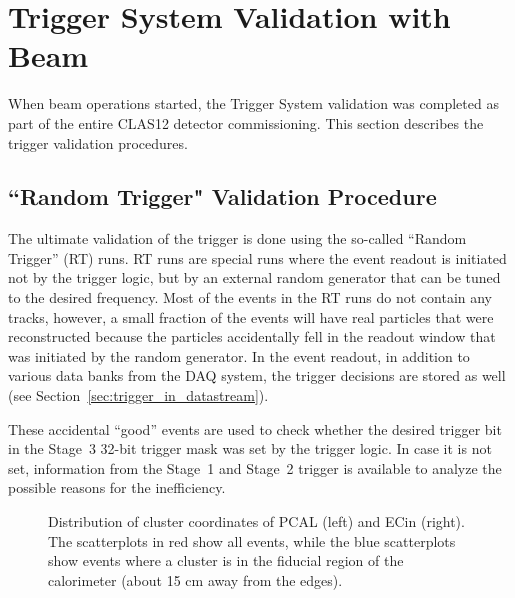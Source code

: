 \section{Trigger System Validation with Beam}
\label{sec:validation}

When beam operations started, the Trigger System validation was completed as part of the entire CLAS12
detector commissioning. This section describes the trigger validation procedures. 

\subsection{``Random Trigger" Validation Procedure}
\label{sec:validation_random}

The ultimate validation of the trigger is done using the so-called ``Random Trigger'' (RT) runs. RT runs are
special runs where the event readout is initiated not by the trigger logic, but by an external random generator
that can be tuned to the desired frequency. Most of the events in the RT runs do not contain any tracks, however,
a small fraction of the events will have real particles that were reconstructed because the particles accidentally
fell in the readout window that was initiated by the random generator. In the event readout, in addition to various
data banks from the DAQ system, the trigger decisions are stored as well (see
Section~\ref{sec:trigger_in_datastream}).

These accidental ``good'' events are used to check whether the desired trigger bit in the Stage~3 32-bit
trigger mask was set by the trigger logic. In case it is not set, information from the Stage~1 and Stage~2 trigger
is available to analyze the possible reasons for the inefficiency.

\begin{figure}[!htb]
	\centering
	\caption{Distribution of cluster coordinates of PCAL (left) and EC{in} (right).
		The scatterplots in red show all events, while the blue scatterplots show events where a cluster
		is in the fiducial region of the calorimeter (about 15 cm away from the edges).}
	\label{fig:pcal_clusters}
\end{figure}

